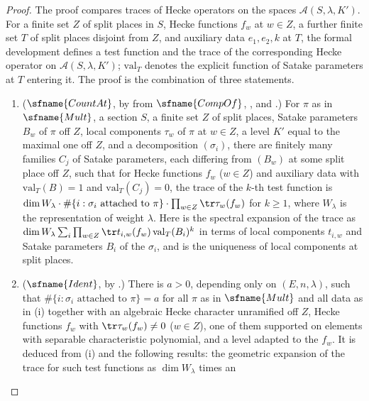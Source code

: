 \begin{proof}
The proof compares traces of Hecke operators on the spaces $\mathcal A(S,\lambda,K')$. For a finite set $Z$ of split places
in $S$, Hecke functions $f_w$ at $w\in Z$, a further finite set $T$ of split places disjoint from $Z$, and auxiliary data
$e_1,e_2,k$ at $T$, the formal development defines a test function and the trace of the corresponding Hecke operator on
$\mathcal A(S,\lambda,K')$; $\mathrm{val}_T$ denotes the explicit function of Satake parameters at $T$ entering it. The
proof is the combination of three statements.
\begin{enumerate}[label=(\roman*)]
\item ($\sfname{CountAt}$, by  from $\sfname{CompOf}$,
,  and
.) For $\pi$ as in $\sfname{Mult}$, a section $S$, a finite
set $Z$ of split places, Satake parameters $B_w$ of $\pi$ off $Z$, local components $\tau_w$ of $\pi$ at $w\in Z$, a level $K'$
equal to the maximal one off $Z$, and a decomposition $(\sigma_i)$, there are finitely many families $C_j$ of Satake
parameters, each differing from $(B_w)$ at some split place off $Z$, such that for Hecke functions $f_w$ ($w\in Z$) and
auxiliary data with $\mathrm{val}_T(B)=1$ and $\mathrm{val}_T(C_j)=0$, the trace of the $k$-th test function is
$\dim W_\lambda\cdot\#\{i:\sigma_i\text{ attached to }\pi\}\cdot\prod_{w\in Z}\tr\tau_w(f_w)$ for $k\ge1$, where
$W_\lambda$ is the representation of weight $\lambda$. Here  is the spectral expansion
of the trace as $\dim W_\lambda\sum_i\prod_{w\in Z}\tr t_{i,w}(f_w)\,\mathrm{val}_T(B_i)^k$ in terms of local components
$t_{i,w}$ and Satake parameters $B_i$ of the $\sigma_i$, and  is the uniqueness of
local components at split places.
\item ($\sfname{Ident}$, by .) There is $a>0$, depending only on $(E,n,\lambda)$,
such that $\#\{i:\sigma_i\text{ attached to }\pi\}=a$ for all $\pi$ as in $\sfname{Mult}$ and all data as in (i) together
with an algebraic Hecke character unramified off $Z$, Hecke functions $f_w$ with $\tr\tau_w(f_w)\ne0$ ($w\in Z$), one of them
supported on elements with separable characteristic polynomial, and a level adapted to the $f_w$. It is deduced from (i)
and the following results: the geometric expansion of the trace for such test functions as $\dim W_\lambda$ times an

\end{enumerate}
\end{proof}
